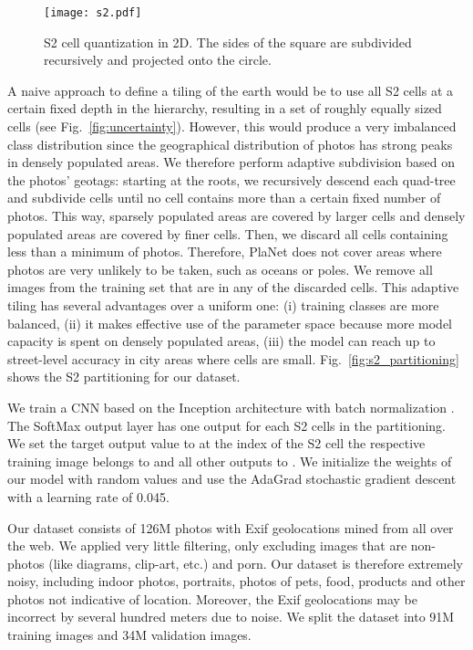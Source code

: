 \documentclass[10pt,twocolumn,letterpaper]{article}
\begin{document}
\begin{figure}[t]
  \centering
  \texttt{[image: s2.pdf]}
  \caption{S2 cell quantization in 2D. The sides of the square are subdivided recursively and projected onto the circle.}
  \label{fig:s2}
\end{figure}

A naive approach to define a tiling of the earth would be to use all
S2 cells at a certain fixed depth in the hierarchy, resulting in a set
of roughly equally sized cells (see Fig.~\ref{fig:uncertainty}). However, this would produce a very
imbalanced class distribution since the geographical distribution of
photos has strong peaks in densely populated areas. We therefore
perform adaptive subdivision based on the photos' geotags: starting at the roots, we recursively
descend each quad-tree and subdivide cells until no cell contains more
than a certain fixed number  of photos. This way, sparsely
populated areas are covered by larger cells and densely populated
areas are covered by finer cells. Then, we discard all cells
containing less than a minimum of  photos. Therefore, PlaNet does not
cover areas where photos are very unlikely to be taken, such as oceans
or poles. We remove all images from the training set that are in
any of the discarded cells. This adaptive tiling has several
advantages over a uniform one: (i) training classes are more balanced,
(ii) it makes effective use of the parameter space because more model
capacity is spent on densely populated areas, (iii) the model can reach
up to street-level accuracy in city areas where cells are small.
Fig.~\ref{fig:s2_partitioning} shows the S2 partitioning for
our dataset.

We train a CNN based on the Inception
architecture \cite{Szegedy15CVPR} with batch
normalization \cite{Ioffe15ICML}. The SoftMax output layer has one
output for each S2 cells in the partitioning. We
set the target output value to  at the index of the S2 cell the respective
training image belongs to and all other outputs to . We initialize the weights of our model with random values and use the AdaGrad \cite{Duchy11JMLR} stochastic gradient descent with a learning rate of 0.045.

Our dataset consists of 126M photos with Exif geolocations
mined from all over the web. We applied very little filtering, only excluding
images that are non-photos (like diagrams, clip-art, etc.) and porn.
Our dataset is therefore extremely noisy, including indoor photos,
portraits, photos of pets, food, products and other photos not
indicative of location. Moreover, the Exif geolocations may be
incorrect by several hundred meters due to noise. We split the dataset into 91M training images and 34M validation images.
\end{document}
